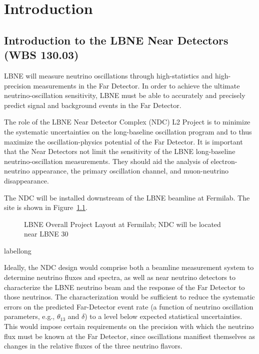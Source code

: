 \chapter{Introduction}  
\label{ch:intro}


%
\clearpage
\section{Introduction to the LBNE Near Detectors (WBS 130.03)}
\label{vol:intro}


LBNE will measure neutrino oscillations through high-statistics 
and high-precision measurements in the Far Detector. 
 In order to achieve the ultimate neutrino-oscillation sensitivity, LBNE must be able to accurately and 
precisely predict signal and background events in the Far Detector.

The role of the LBNE Near Detector Complex (NDC) L2 Project is to 
minimize the systematic uncertainties on 
the long-baseline oscillation program and to thus maximize the 
oscillation-physics potential of the Far Detector. It is important that the
 Near Detectors not limit the sensitivity of the 
LBNE long-baseline neutrino-oscillation measurements. 
They should aid the analysis of electron-neutrino 
appearance, the primary oscillation channel, and muon-neutrino disappearance. 

The NDC will be installed downstream of the LBNE beamline at Fermilab. The site is shown in Figure~\ref{fig:nscf_layout-v3}.

\begin{figure}[htbp]
\centering
\caption{LBNE Overall Project Layout at Fermilab; NDC will be located near LBNE 30}
\label{fig:nscf_layout-v3}
\end{figure}
\begin{cdrfigure}[short]{label}{long}
\end{cdrfigure}

Ideally, the NDC design would comprise both a beamline measurement system to determine neutrino fluxes and spectra, as well as near neutrino detectors to characterize the LBNE neutrino beam and
the response of the Far Detector to those neutrinos.  The characterization would be sufficient to reduce the systematic errors
on the predicted Far-Detector event rate (a function of neutrino oscillation 
parameters, e.g., $\theta_{13}$ and $\delta$) to a level below expected statistical uncertainties.
This would impose certain requirements on
the precision with which the neutrino flux must be known at the Far Detector, since
oscillations manifiest themselves as changes in the relative fluxes of the three neutrino
flavors.

